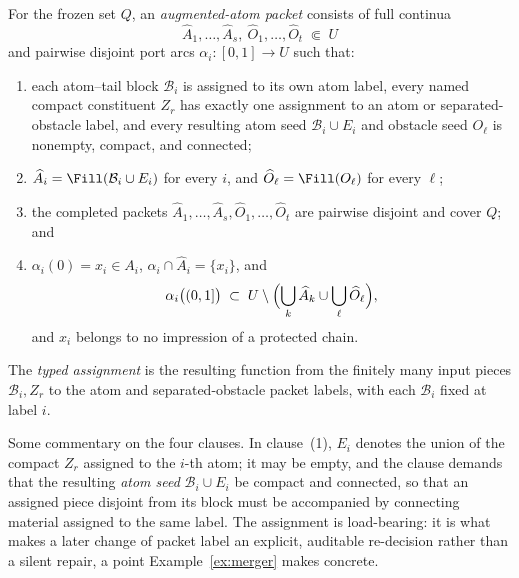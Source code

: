 \begin{definition}\label{def:packet}
For the frozen set $Q$, an \emph{augmented-atom packet} consists of full continua
\[
\widehat A_1,\dots,\widehat A_s,\
\widehat O_1,\dots,\widehat O_t\;\Subset\;U
\]
and pairwise disjoint port arcs $\alpha_i\colon[0,1]\to U$ such that:
\begin{enumerate}
\item each atom--tail block $\mathcal B_i$ is assigned to its own atom label, every
named compact constituent $Z_r$ has exactly one assignment to an atom or
separated-obstacle label, and every resulting atom seed $\mathcal B_i\cup E_i$ and
obstacle seed $O_\ell$ is nonempty, compact, and connected;
\item $\widehat A_i=\Fill(\mathcal B_i\cup E_i)$ for every $i$, and
$\widehat O_\ell=\Fill(O_\ell)$ for every $\ell$;
\item the completed packets
$\widehat A_1,\dots,\widehat A_s,\widehat O_1,\dots,\widehat O_t$ are pairwise
disjoint and cover $Q$; and
\item $\alpha_i(0)=x_i\in A_i$, $\alpha_i\cap\widehat A_i=\{x_i\}$, and
\[
\alpha_i\bigl((0,1]\bigr)\;\subset\;
U\setminus\Bigl(\bigcup_{k}\widehat A_k\cup\bigcup_{\ell}\widehat O_\ell\Bigr),
\]
and $x_i$ belongs to no impression of a protected chain.
\end{enumerate}
The \emph{typed assignment} is the resulting function from the finitely
many input pieces $\mathcal B_i,Z_r$ to the atom and separated-obstacle packet
labels, with each $\mathcal B_i$ fixed at label $i$.
\end{definition}

Some commentary on the four clauses. In clause~(1), $E_i$ denotes the
union of the compact $Z_r$ assigned to the $i$-th atom; it may be empty,
and the clause demands that the resulting \emph{atom seed}
$\mathcal B_i\cup E_i$ be compact and connected, so that an assigned piece
disjoint from its block must be accompanied by connecting material assigned
to the same label.  The assignment is load-bearing: it is what makes a later
change of packet label an explicit, auditable re-decision rather than a silent repair, a point
Example~\ref{ex:merger} makes concrete.


